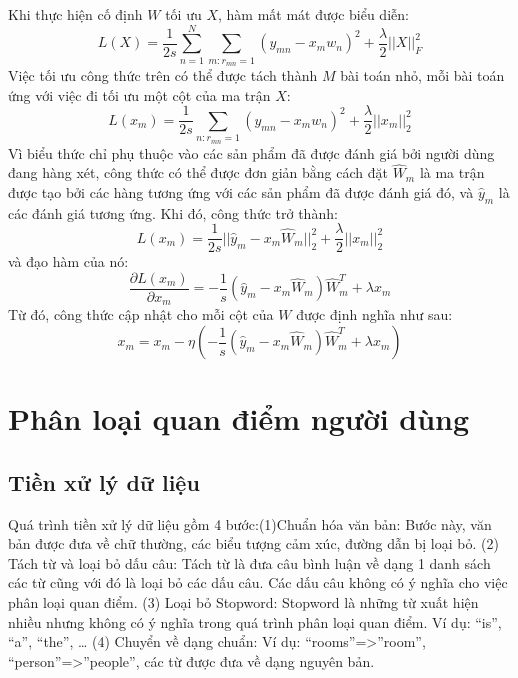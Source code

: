 Khi thực hiện cố định $W$ tối ưu $X$, hàm mất mát được biểu diễn:
\begin{equation}
    L(X)=\frac{1}{2s}\sum^N_{n=1}\sum_{m:r_{mn}=1}(y_{mn}-x_m w_n)^2+\frac{\lambda}{2}||X||^2_F
\end{equation}
Việc tối ưu công thức trên có thể được tách thành $M$ bài toán nhỏ, mỗi bài toán ứng với việc đi tối ưu một cột của ma trận $X$:
\begin{equation}
    L(x_m)=\frac{1}{2s}\sum_{n:r_{mn}=1}(y_{mn}-x_m w_n)^2+\frac{\lambda}{2}||x_m||^2_2
\end{equation}
Vì biểu thức chỉ phụ thuộc vào các sản phẩm đã được đánh giá bởi người dùng đang hàng xét, công thức có thể được đơn giản bằng cách đặt $\hat{W}_m$ là ma trận được tạo bởi các hàng tương ứng với các sản phẩm đã được đánh giá đó, và $\hat{y}_m$ là các đánh giá tương ứng. Khi đó, công thức trở thành:
\begin{equation}
    L(x_m) = \frac{1}{2s}||\hat{y}_m - x_m \hat{W}_m||_2^2 + \frac{\lambda}{2}||x_m||^2_2
\end{equation}
và đạo hàm của nó:
\begin{equation}
    \frac{\partial L(x_m)}{\partial x_m} = -\frac{1}{s}\left(\hat{y}_m-x_m\hat{W}_m\right)\hat{W}^T_m + \lambda x_m
\end{equation}
Từ đó, công thức cập nhật cho mỗi cột của $W$ được định nghĩa như sau:
\begin{equation}
    x_m = x_m - \eta\left(-\frac{1}{s}(\hat{y}_m - x_m\hat{W}_m)\hat{W}_m^T+\lambda x_m\right)
\end{equation}

\section{Phân loại quan điểm người dùng}
\subsection{Tiền xử lý dữ liệu}
Quá trình tiền xử lý dữ liệu gồm 4 bước:(1)Chuẩn hóa văn bản: Bước này, văn bản được đưa về 
chữ thường, các biểu tượng cảm xúc, đường dẫn bị loại bỏ. (2) Tách từ và loại bỏ dấu câu: Tách 
từ là đưa câu bình luận về dạng 1 danh sách các từ cũng với đó là loại bỏ các dấu câu. Các dấu 
câu không có ý nghĩa cho việc phân loại quan điểm. (3) Loại bỏ Stopword: Stopword là những từ 
xuất hiện nhiều nhưng không có ý nghĩa trong quá trình phân loại quan điểm. Ví dụ: “is”, “a”, 
“the”, … (4) Chuyển về dạng chuẩn: Ví dụ: “rooms”=>”room”, “person”=>”people”, các từ được đưa 
về dạng nguyên bản.

